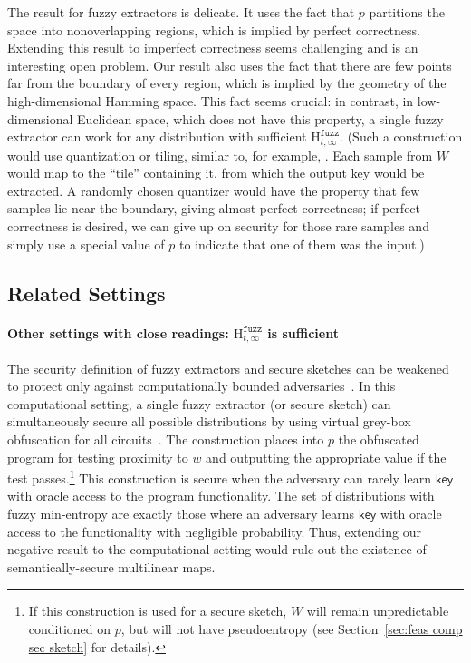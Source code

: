 \documentclass[11pt]{article}
\newcommand{\secref}[1]{\mbox{Section~\ref{#1}}}
\newcommand{\class}[1]{{\ensuremath{\mathsf{#1}}}}
\newcommand{\key}{\ensuremath{\class{key}}\xspace}
\newcommand{\Hfuzz}{\mathrm{H}^{\mathtt{fuzz}}_{t,\infty}}
\begin{document}
The result for fuzzy extractors is delicate.  It uses the fact that $p$ partitions the space into nonoverlapping regions, which is implied by perfect correctness.  Extending this result to imperfect correctness seems challenging and is an interesting open problem. Our result also uses the fact that there are few points far from the boundary of every region, which is implied by the geometry of  the high-dimensional Hamming space.  This fact seems crucial: in contrast, in low-dimensional Euclidean space, which does not have this property, a single fuzzy extractor can work for any distribution with sufficient $\Hfuzz$. (Such a construction would use quantization or tiling, similar to, for example, \cite{CK03,LT03,CZC04,LC06,BDHTV10,VTOSS10}.  Each sample from $W$ would map to the ``tile'' containing it, from which the output key would be extracted. A randomly chosen quantizer would have the property that few samples lie near the boundary, giving almost-perfect correctness; if perfect correctness is desired, we can give up on security for those rare samples and simply use a special value of $p$ to indicate that one of them was the input.)

\subsection{Related Settings}
\label{sec:related settings}
\paragraph{Other settings with close readings:  $\Hfuzz$ is sufficient}
The security definition of fuzzy extractors and secure sketches can be weakened to protect only against computationally bounded adversaries~\cite{fuller2013computational}.   In this computational setting, a single fuzzy extractor (or secure sketch) can simultaneously secure all possible distributions by using virtual grey-box obfuscation for all circuits~\cite{BitanskyCKP14}. The construction places into $p$ the obfuscated program for testing proximity to $w$ and outputting the appropriate value if the test passes.\footnote{If this construction is used for a secure sketch, $W$ will remain unpredictable conditioned on $p$, but will not have pseudoentropy (see  \secref{sec:feas comp sec sketch} for details).}  This construction is secure when the adversary can rarely learn \key with oracle access to the program functionality.  The set of distributions with fuzzy min-entropy are exactly those where an adversary learns \key with oracle access to the functionality with negligible probability. Thus, extending our negative result to the computational setting would rule out the existence of semantically-secure multilinear maps.
\end{document}
